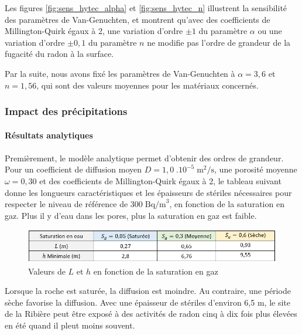 \documentclass{article}
\begin{document}
Les figures \ref{fig:sens_hytec_alpha} et \ref{fig:sens_hytec_n} illustrent la sensibilité des paramètres de Van-Genuchten, et montrent qu'avec des coefficients de Millington-Quirk égaux à 2, une variation d’ordre $\pm 1$ du paramètre $\alpha$ ou une variation d’ordre $\pm 0,1$ du paramètre $n$ ne modifie pas l’ordre de grandeur de la fugacité du radon à la surface.

Par la suite, nous avons fixé les paramètres de Van-Genuchten à $\alpha = 3,6$ et $n=1,56$, qui sont des valeurs moyennes pour les matériaux concernés.

\newpage
\subsubsection{Impact des précipitations}

\paragraph{Résultats analytiques}

\paragraph{} Premièrement, le modèle analytique permet d'obtenir des ordres de grandeur. Pour un coefficient de diffusion moyen $D=1,0 \; .10^{-5} \; \text{m}^2/\text{s}$, une porosité moyenne $\omega=0,30$ et des coefficients de Millington-Quirk égaux à 2, le tableau suivant donne les longueurs caractéristiques et les épaisseurs de stériles nécessaires pour respecter le niveau de référence de $300\; \text{Bq/m}^3$, en fonction de la saturation en gaz. Plus il y d’eau dans les pores, plus la saturation en gaz est faible.

\begin{figure}[H]
    \centering
    \includegraphics[width = \linewidth]{III_C_4.png}
    \caption{Valeurs de $L$ et $h$ en fonction de la saturation en gaz}
    \label{fig:tableau_saturation}
\end{figure}

Lorsque la roche est saturée, la diffusion est moindre. Au contraire, une période sèche favorise la diffusion. Avec une épaisseur de stériles d'environ 6,5 m, le site de la Ribière peut être exposé à des activités de radon cinq à dix fois plus élevées en été quand il pleut moins souvent.
\end{document}
